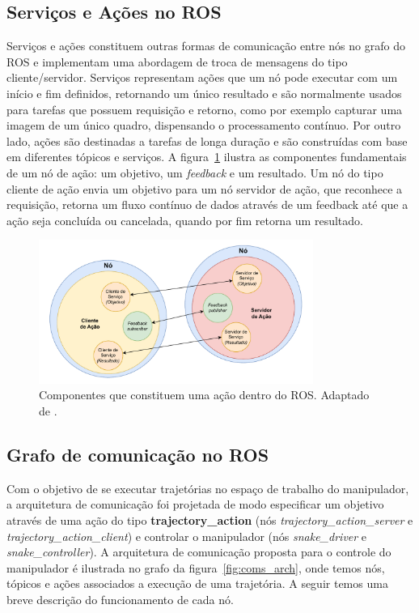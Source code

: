 \subsection*{Serviços e Ações no ROS}

Serviços e ações constituem outras formas de comunicação entre nós no grafo do
ROS e implementam uma abordagem de troca de mensagens do tipo cliente/servidor.
Serviços representam ações que um nó pode executar com um início e fim
definidos, retornando um único resultado e são normalmente usados para tarefas
que possuem requisição e retorno, como por exemplo capturar uma imagem de um
único quadro, dispensando o processamento contínuo. Por outro lado, ações são
destinadas a tarefas de longa duração e são construídas com base em diferentes
tópicos e serviços. A figura~\ref{fig:ros-action} ilustra as componentes fundamentais
de um nó de ação: um objetivo, um \emph{feedback} e um resultado. Um nó do tipo cliente de ação envia um objetivo
para um nó servidor de ação, que reconhece a requisição, retorna um fluxo
contínuo de dados através de um feedback até que a ação seja concluída ou
cancelada, quando por fim retorna um resultado.

\begin{figure}
	\centering
	\includegraphics[width=0.8\textwidth]{./Images/ros-action.pdf}
	\caption{Componentes que constituem uma ação dentro do ROS. Adaptado de \cite[p. 36]{bassa_very_2023}.}\label{fig:ros-action}
\end{figure}

\subsection*{Grafo de comunicação no ROS}

Com o objetivo de se executar trajetórias no espaço de trabalho do manipulador,
a arquitetura de comunicação foi projetada de modo especificar um objetivo
através de uma ação do tipo \textbf{trajectory\_action} (nós
\emph{trajectory\_action\_server} e \emph{trajectory\_action\_client}) e
controlar o manipulador (nós \emph{snake\_driver} e \emph{snake\_controller}).
A arquitetura de comunicação proposta para o controle do manipulador é
ilustrada no grafo da figura~\ref{fig:coms_arch}, onde temos nós, tópicos e
ações associados a execução de uma trajetória. A seguir temos uma breve
descrição do funcionamento de cada nó.

